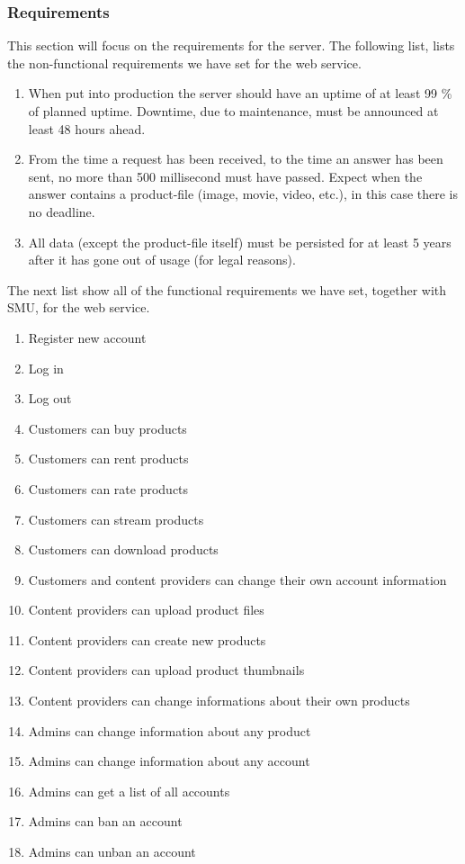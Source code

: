 \subsubsection{Requirements}
\label{s_serviceRequirements}
This section will focus on the requirements for the server. The following list, lists the non-functional requirements we have set for the web service.
\\
\begin{enumerate}[label=NFR-\arabic*]
	\item When put into production the server should have an uptime of at least 99 \% of planned uptime. Downtime, due to maintenance, must be announced at least 48 hours ahead.
	\item From the time a request has been received, to the time an answer has been sent, no more than 500 millisecond must have passed. Expect when the answer contains a product-file (image, movie, video, etc.), in this case there is no deadline.
	\item All data (except the product-file itself) must be persisted for at least 5 years after it has gone out of usage (for legal reasons).
\end{enumerate}

The next list show all of the functional requirements we have set, together with SMU, for the web service.

\begin{enumerate}[label=FR-\arabic*]
	\item Register new account
	\item Log in
	\item Log out
	\item Customers can buy products
	\item Customers can rent products
	\item Customers can rate products
	\item Customers can stream products
	\item Customers can download products
	\item Customers and content providers can change their own account information
	\item Content providers can upload product files
	\item Content providers can create new products
	\item Content providers can upload product thumbnails
	\item Content providers can change informations about their own products
	\item Admins can change information about any product
	\item Admins can change information about any account
	\item Admins can get a list of all accounts
	\item Admins can ban an account
	\item Admins can unban an account
\end{enumerate}